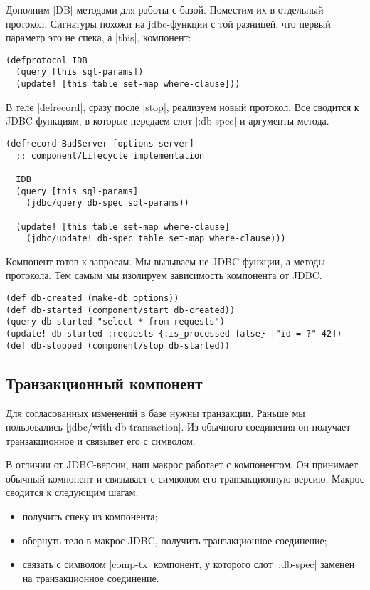 Дополним \spverb|DB| методами для работы с базой. Поместим их в отдельный
протокол. Сигнатуры похожи на jdbc-функции с той разницей, что первый параметр
это не спека, а \spverb|this|, компонент:

\begin{verbatim}
(defprotocol IDB
  (query [this sql-params])
  (update! [this table set-map where-clause]))
\end{verbatim}

В теле \spverb|defrecord|, сразу после \spverb|stop|, реализуем новый
протокол. Все сводится к JDBC-функциям, в которые передаем слот
\spverb|:db-spec| и аргументы метода.

\begin{verbatim}
(defrecord BadServer [options server]
  ;; component/Lifecycle implementation

  IDB
  (query [this sql-params]
    (jdbc/query db-spec sql-params))

  (update! [this table set-map where-clause]
    (jdbc/update! db-spec table set-map where-clause)))
\end{verbatim}

Компонент готов к запросам. Мы вызываем не JDBC-функции, а методы протокола. Тем
самым мы изолируем зависимость компонента от JDBC.

\begin{verbatim}
(def db-created (make-db options))
(def db-started (component/start db-created))
(query db-started "select * from requests")
(update! db-started :requests {:is_processed false} ["id = ?" 42])
(def db-stopped (component/stop db-started))
\end{verbatim}

\subsection{Транзакционный компонент}

Для согласованных изменений в базе нужны транзакции. Раньше мы пользовались
\spverb|jdbc/with-db-transaction|. Из обычного соединения он получает
транзакционное и связывет его с символом.

В отличии от JDBC-версии, наш макрос работает с компонентом. Он принимает
обычный компонент и связывает с символом его транзакционную версию. Макрос
сводится к следующим шагам:

\begin{itemize}

\item
  получить спеку из компонента;

\item
  обернуть тело в макрос JDBC, получить транзакционное соединение;

\item
  связать с символом \spverb|comp-tx| компонент, у которого слот \spverb|:db-spec| заменен на
  транзакционное соединение.

\end{itemize}

